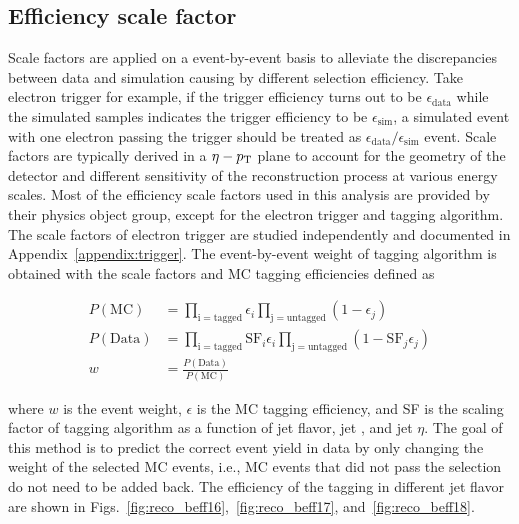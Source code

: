 \subsection{Efficiency scale factor}
Scale factors are applied on a event-by-event basis to alleviate the discrepancies between data and simulation causing by different selection efficiency.
Take electron trigger for example, if the trigger efficiency turns out to be $\epsilon_{\mathrm{data}}$ while the simulated samples indicates the trigger efficiency to be $\epsilon_{\mathrm{sim}}$, a simulated event with one electron passing the trigger should be treated as $\epsilon_{\mathrm{data}}/\epsilon_{\mathrm{sim}}$ event.
Scale factors are typically derived in a $\eta-p_{\mathrm{T}}$ plane to account for the geometry of the detector and different sensitivity of the reconstruction process at various energy scales.
Most of the efficiency scale factors used in this analysis are provided by their physics object group, except for the electron trigger and \PQb tagging algorithm.
The scale factors of electron trigger are studied independently and documented in Appendix~\ref{appendix:trigger}.
The event-by-event weight of \PQb tagging algorithm is obtained with the scale factors and MC \PQb tagging efficiencies defined as
\begin{linenomath}\begin{equation}\begin{aligned}\label{eq:data_btagsf}
    P(\mathrm{MC}) &= \prod_{\mathrm{i=tagged}} \epsilon_{i} \prod_{\mathrm{j=untagged}} (1-\epsilon_{j}) \\
    P(\mathrm{Data}) &= \prod_{\mathrm{i=tagged}} \mathrm{SF}_i\epsilon_{i} \prod_{\mathrm{j=untagged}} (1-\mathrm{SF}_j\epsilon_{j}) \\
    w &= \frac{P(\mathrm{Data})}{P(\mathrm{MC})}
\end{aligned}\end{equation}\end{linenomath}
where $w$ is the event weight, $\epsilon$ is the MC \PQb tagging efficiency, and SF is the scaling factor of \PQb tagging algorithm as a function of jet flavor, jet \PT, and jet $\eta$. 
The goal of this method is to predict the correct event yield in data by only changing the weight of the selected MC events, i.e., MC events that did not pass the selection do not need to be added back.
The efficiency of the \PQb tagging in different jet flavor are shown in Figs.~\ref{fig:reco_beff16},~\ref{fig:reco_beff17}, and~\ref{fig:reco_beff18}. 

